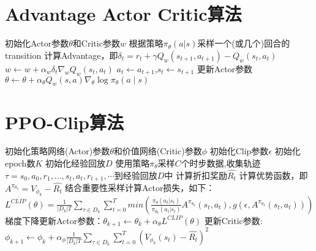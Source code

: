 \documentclass[11pt]{ctexart}
\begin{document}
\section{Advantage Actor Critic算法}
\begin{algorithm}[H] %
	\renewcommand{\thealgorithm}{} %
	\caption{} 
	\begin{algorithmic}[1] %
		\STATE 初始化Actor参数$\theta$和Critic参数$w$
			\STATE 根据策略$\pi_{\theta}(a|s)$采样一个(或几个)回合的transition
				\STATE 计算Advantage，即$ \delta_t = r_t + \gamma Q_w(s_{t+1},a_{t+1})-Q_w(s_t,a_t)$
				\STATE $w \leftarrow w+\alpha_{w} \delta_{t} \nabla_{w} Q_w(s_t,a_t)$
				\STATE $a_t \leftarrow a_{t+1}$,$s_t \leftarrow s_{t+1}$
			\ENDFOR
			\STATE 更新Actor参数$\theta \leftarrow \theta+\alpha_{\theta} Q_{w}(s, a) \nabla_{\theta} \log \pi_{\theta}(a \mid s)$
		\ENDFOR
	\end{algorithmic}
\end{algorithm}
\clearpage

\section{PPO-Clip算法}
\begin{algorithm}[H] %
	\renewcommand{\thealgorithm}{} %
	\caption{} 
	\begin{algorithmic}[1] %
		\STATE 初始化策略网络(Actor)参数$\theta$和价值网络(Critic)参数$\phi$
		\STATE 初始化Clip参数$\epsilon$
		\STATE 初始化epoch数$K$
		\STATE 初始化经验回放$D$
			\STATE 使用策略$\pi_{\theta}$采样$C$个时步数据,收集轨迹$\tau = {s_0,a_0,r_1,...,s_t,a_t,r_{t+1},\cdots}$到经验回放$D$中
				\STATE 计算折扣奖励$\hat{R_t}$
				\STATE 计算优势函数，即$A^{\pi_{\theta_{k}}}=V_{\phi_k}-\hat{R_t}$
				\STATE 结合重要性采样计算Actor损失，如下：
				\STATE $L^{CLIP}(\theta)= \frac{1}{|D_k|T}\sum_{\tau \in D_k}\sum_{t=0}^{T} min(\frac{\pi_\theta(a_t|s_t)}{\pi_{\theta_{k}}(a_t|s_t)} A^{\pi_{\theta_{k}}}(s_t,a_t), g(\epsilon,A^{\pi_{\theta_{k}}}(s_t,a_t)))$
				\STATE 梯度下降更新Actor参数：$\theta_{k+1} \leftarrow \theta_{k} + \alpha_{\theta} L^{CLIP}(\theta)$
				\STATE 更新Critic参数:
				\STATE $\phi_{k+1} \leftarrow \phi_{k}+ \alpha_{\phi}\frac{1}{|D_k|T}\sum_{\tau \in D_k}\sum_{t=0}^{T} (V_{\phi_{k}}(s_t)-\hat{R_t})^2$
			\ENDFOR
		\ENDFOR
	\end{algorithmic}
\end{algorithm}
\end{document}
